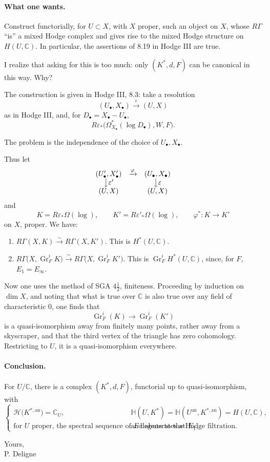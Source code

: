 \documentclass[11pt]{article}
\newcommand{\Gr}{\operatorname{Gr}}
\newcommand{\RG}{R\Gamma}
\newcommand{\HH}{\mathcal H}
\newcommand{\C}{\mathbb C}
\begin{document}
\paragraph{What one wants.}
Construct functorially, for \(U\subset X\), with \(X\) proper, such an object on \(X\), whose \(R\Gamma\) ``is'' a mixed Hodge complex and gives rise to the mixed Hodge structure on \(H(U,\C)\). In particular, the assertions of 8.19 in Hodge III are true.

I realize that asking for this is too much: only \((K^\ast,d,F)\) can be canonical in this way. Why?

The construction is given in Hodge III, 8.3: take a resolution
\[
  (U_\bullet,X_\bullet) \xrightarrow{\varepsilon} (U,X)
\]
as in Hodge III, and, for \(D_\bullet=X_\bullet-U_\bullet\),
\[
  R\varepsilon_\ast\bigl(\Omega^\ast_{X_\bullet}(\log D_\bullet),W,F\bigr).
\]

The problem is the independence of the choice of \(U_\bullet,X_\bullet\).

Thus let
\[
\begin{array}{ccc}
(U'_\bullet,X'_\bullet) & \xrightarrow{\varphi} & (U_\bullet,X_\bullet)\\
\big\downarrow{\varepsilon'} && \big\downarrow{\varepsilon}\\
(U,X) && (U,X)
\end{array}
\]
and
\[
  K=R\varepsilon_\ast\Omega(\log),\qquad
  K'=R\varepsilon'_\ast\Omega(\log),\qquad
  \varphi^\ast:K\longrightarrow K'
\]
on \(X\), proper. We have:
\begin{enumerate}[label=\arabic*)]
\item \(\RG(X,K)\xrightarrow{\sim}\RG(X,K')\). This is \(H^\ast(U,\C)\).
\item \(\RG\bigl(X,\Gr_F^iK\bigr)\xrightarrow{\sim}\RG\bigl(X,\Gr_F^iK'\bigr)\). This is \(\Gr_F^iH^\ast(U,\C)\), since, for \(F\), \(E_1=E_\infty\).
\end{enumerate}

Now one uses the method of SGA \(4\frac12\), finiteness. Proceeding by induction on \(\dim X\), and noting that what is true over \(\C\) is also true over any field of characteristic \(0\), one finds that
\[
  \Gr_F^i(K)\longrightarrow \Gr_F^i(K')
\]
is a quasi-isomorphism away from finitely many points, rather away from a skyscraper, and that the third vertex of the triangle has zero cohomology. Restricting to \(U\), it is a quasi-isomorphism everywhere.

\paragraph{Conclusion.}
For \(U/\C\), there is a complex \((K^\ast,d,F)\), functorial up to quasi-isomorphism, with
\[
\begin{cases}
\HH\bigl(K^{\ast,\mathrm{an}}\bigr)=\C_U,
& \mathbb H(U,K^\ast)=\mathbb H(U^{\mathrm{an}},K^{\ast,\mathrm{an}})=H(U,\C),\\[0.35em]
\text{for }U\text{ proper, the spectral sequence of }F\text{ degenerates at }E_1,
& \text{and abuts to the Hodge filtration.}
\end{cases}
\]

\begin{flushright}
Yours,\\
P. Deligne
\end{flushright}
\end{document}
